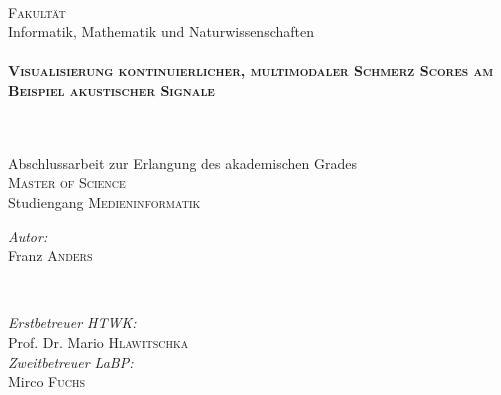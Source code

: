\begin{titlepage}
\begin{minipage}{0.48\textwidth}
\end{minipage}\\[1cm]





\large \textsc{Fakultät} \\ Informatik, Mathematik und Naturwissenschaften\\[0.5cm] %


\HRule \\[0.4cm]
{ \huge \bfseries \textsc{Visualisierung kontinuierlicher, multimodaler Schmerz Scores am \\[0.3cm] Beispiel akustischer Signale}}
\subtitle{Masterarbeit}\\[0.2cm] %
\HRule \\[0.5cm]
 
\large Abschlussarbeit zur Erlangung des akademischen Grades \\ 
\textsc{Master of Science}\\[2cm]

\large Studiengang \textsc{Medieninformatik}\\[3.5cm]


\begin{minipage}{0.4\textwidth}
\begin{flushleft} \large
\emph{Autor:}\\
Franz \textsc{Anders} %
\end{flushleft}
\end{minipage}
~
\begin{minipage}{0.4\textwidth}
\begin{flushright} \large
\emph{Erstbetreuer HTWK:} \\
Prof. Dr. Mario \textsc{Hlawitschka} %
\\[0.5cm]
\emph{Zweitbetreuer LaBP:} \\
Mirco \textsc{Fuchs}
\end{flushright}
\end{minipage}\\[1.5cm]


\end{titlepage}
